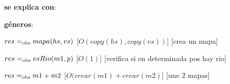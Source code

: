 \begin{Interfaz}
  
    \textbf{se explica con}: 
  
    \textbf{géneros}: 
  
  
    {$res =_{\mathrm{obs}} mapa(hs, vs)$}%
      [$O(copy(hs), copy(vs))$]
    [crea un mapa]

    {$res =_{\mathrm{obs}} esRio(m1, p)$}%
      [$O(1)$]
    [verifica si en determinada pos hay rio] 

    {$res =_{\mathrm{obs}} m1 + m2$}%
      [$O(crear(m1) + crear(m2)$]
    [une 2 mapas] 
    \\
  \end{Interfaz}